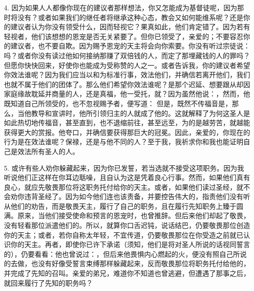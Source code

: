 4. 因为如果人人都像你现在的建议者那样想法，你又怎能成为基督徒呢，因为那时将没有？或者如果我们的继任者将继承这种心态，教会又如何能维系呢？还是你的建议者认为你没有领受什么，因而轻视它？果真如此，他们肯定错了。因为若有轻视者，他们该想想的恩宠是否无关紧要了。但你已领受了，亲爱的；不要容忍你的建议者，也不要自欺。因为赐予恩宠的天主将会向你索要。你没有听过宗徒说：吗？或者你没有读过他如何接纳那赚了双倍钱的人，而定了那埋藏钱的人的罪吗？但愿你快快回来，好使你也能成为受称赞的人之一。或者告诉我，你的建议者希望你效法谁呢？因为我们应当以和为标准行事，效法他们，并确信若离开他们，我们也就不属于他们的团体了。那么他们希望你效法谁呢？是那个迟延、想要跟从却因家庭缘故耽延并商量的人，还是真福，他一受托，就？因为虽然他说：，然而，他既知道自己所领受的，也不忽视赐予者，便写道： 但是，既然不传福音是，那么，当他教导和宣讲时，他所引领归主的人就成了他的。这就解释了为何这圣人是如此热切地传福音，甚至直到，也不退缩前往，甚至远至，为的是越劳苦，就越能获得更大的赏报。他夸口，并确信要获得那巨大的冠冕。因此，亲爱的，你现在的行为是在效法谁呢？保禄，还是与他不同的人？至于我，我祈求你和我也能证明自己是效法所有圣人的人。\par

5. 或许有些人劝你躲藏起来，因为你已发誓，若当选就不接受这项职务。因为我听说他们正这样在你耳边聒噪，且自认为这是凭着良心行事。然而，如果他们真有良心，就应先敬畏那位将这职务托付给你的天主。或者，如果他们读过圣经，就不会劝你违背圣经了。因为如今他们连也该责备，并要控告伟大的，指责他们没有听从他们的劝告，而是敬畏天主，履行了自己的职务，且在履行先知职务上臻于圆满。原来，当他们接受使命和预言的恩宠时，也曾推辞。但后来他们却起了敬畏，没有轻看那位派遣他们的。所以，就算你口舌迟钝，说话结巴，仍要敬畏那位创造你的天主；或者，若你自称太年轻，不宜传道，仍要敬畏那位在你受造之前就已认识你的天主。再者，即使你已许下承诺（须知，他们是将对圣人所说的话视同誓言的），仍要看看：他也曾说过：，但后来他畏惧内心燃起的火，便没有照自己所说的去做，也没有好像受誓言束缚那样躲藏起来，反而敬畏那位将职务托付给他的，并完成了先知的召叫。亲爱的弟兄，难道你不知道也曾逃避，但遭遇了那事之后，就回来履行了先知的职务吗？\par

